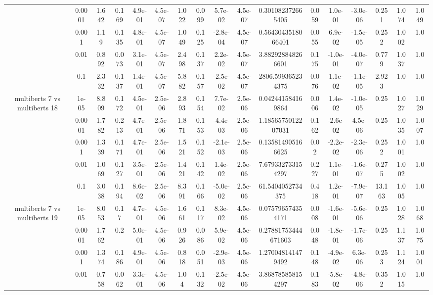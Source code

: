 \begin{tabular}{|c|c|c|c|c|c|c|c|c|c|c|c|c|c|c|c|c|}
 & 0.0001 & 1.642 & 0.169 & 4.9e-01 & 4.5e-07 & 1.022 & 0.099 & 5.7e-02 & 4.5e-07 & 0.301082372665405 & 0.059 & 1.0e-01 & -3.0e-06 & 0.251 & 1.074 & 1.049 \\
 & 0.001 & 1.19 & 0.135 & 4.8e-01 & 4.5e-07 & 1.049 & 0.125 & -2.8e-04 & 4.5e-07 & 0.5643043518066401 & 0.055 & 6.9e-02 & -1.5e-05 & 0.252 & 1.002 & 1.0 \\
 & 0.01 & 0.892 & 0.073 & 3.1e-01 & 4.5e-07 & 2.498 & 0.137 & 2.2e-02 & 4.5e-07 & 3.882928848266601 & 0.175 & -1.0e-01 & -4.0e-07 & 0.779 & 1.037 & 1.0 \\
 & 0.1 & 2.332 & 0.137 & 1.4e-01 & 4.5e-07 & 5.882 & 0.157 & -2.5e-02 & 4.5e-07 & 2806.599365234375 & 0.076 & 1.1e-02 & -1.1e-05 & 2.923 & 1.0 & 1.0 \\
\hline
\multirow{5}{*}{multiberts 7 vs multiberts 18} & 1e-05 & 8.809 & 0.172 & 4.5e-01 & 2.5e-06 & 2.893 & 0.154 & 7.7e-02 & 2.5e-06 & 0.042441584169864 & 0.006 & 1.4e-02 & -1.0e-05 & 0.25 & 1.027 & 1.029 \\
 & 0.0001 & 1.782 & 0.213 & 4.7e-01 & 2.5e-06 & 1.871 & 0.153 & -4.4e-03 & 2.5e-06 & 1.1856575012207031 & 0.162 & -2.6e-02 & 4.5e-06 & 0.25 & 1.035 & 1.007 \\
 & 0.001 & 1.339 & 0.171 & 4.7e-01 & 2.5e-06 & 1.521 & 0.152 & -2.1e-03 & 2.5e-06 & 0.135814905166625 & 0.02 & -2.2e-02 & -2.3e-06 & 0.252 & 1.001 & 1.0 \\
 & 0.01 & 1.069 & 0.127 & 3.5e-01 & 2.5e-06 & 1.421 & 0.142 & 1.4e-02 & 2.5e-06 & 7.679332733154297 & 0.227 & 1.1e-01 & -1.6e-07 & 0.275 & 1.002 & 1.0 \\
 & 0.1 & 3.038 & 0.194 & 8.6e-02 & 2.5e-06 & 8.391 & 0.166 & -5.0e-02 & 2.5e-06 & 61.5404052734375 & 0.418 & 1.2e-01 & -7.9e-07 & 13.163 & 1.005 & 1.0 \\
\hline
\multirow{5}{*}{multiberts 7 vs multiberts 19} & 1e-05 & 8.053 & 0.17 & 4.7e-01 & 4.5e-06 & 1.661 & 0.117 & 8.3e-02 & 4.5e-06 & 0.075796574354171 & 0.008 & -1.6e-01 & -5.6e-06 & 0.25 & 1.028 & 1.068 \\
 & 0.0001 & 1.762 & 0.2 & 5.0e-01 & 4.5e-06 & 0.926 & 0.086 & 5.9e-02 & 4.5e-06 & 0.27881753444671603 & 0.048 & -1.8e-01 & -1.7e-06 & 0.25 & 1.137 & 1.075 \\
 & 0.001 & 1.374 & 0.186 & 4.9e-01 & 4.5e-06 & 0.818 & 0.051 & -2.9e-03 & 4.5e-06 & 1.270048141479492 & 0.148 & -4.9e-02 & 6.3e-06 & 0.253 & 1.124 & 1.001 \\
 & 0.01 & 0.758 & 0.062 & 3.3e-01 & 4.5e-06 & 1.04 & 0.132 & -2.5e-02 & 4.5e-06 & 3.868785858154297 & 0.183 & -5.8e-02 & -4.8e-06 & 0.352 & 1.015 & 1.0 \\

\end{tabular}
